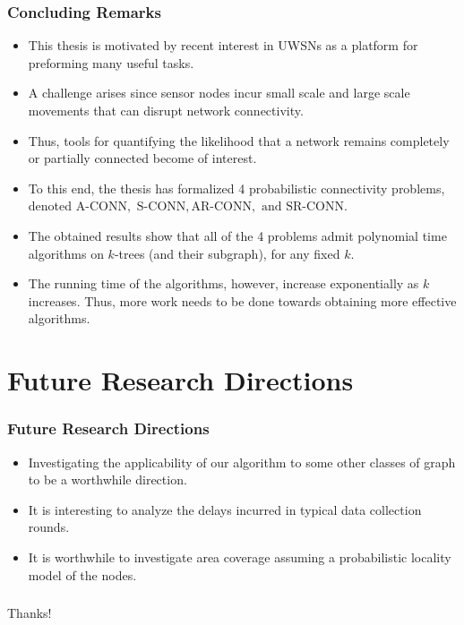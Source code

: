 \documentclass{beamer}
\newcommand{\ACONN}   { {\mathrm {A\mbox{-}CONN}} }
\newcommand{\SCONN}   { {\mathrm {S\mbox{-}CONN}} }
\newcommand{\ARCONN}   { {\mathrm {AR\mbox{-}CONN}} }
\newcommand{\SRCONN}   { {\mathrm {SR\mbox{-}CONN}} }
\begin{document}
\begin{frame}
\frametitle{Concluding Remarks}
\begin{itemize}
\item This thesis is motivated by recent interest in UWSNs as a platform for preforming many useful tasks. 
\item A challenge arises since sensor nodes incur small scale and large scale movements that can disrupt network connectivity.
\item  Thus, tools for quantifying the likelihood that a network remains completely or partially connected become of interest.

\item To this end, the thesis has formalized 4 probabilistic connectivity problems, denoted $\ACONN,$ $ \SCONN, \ARCONN, \mbox{ and } \SRCONN$. 
\item The obtained results show that all of the 4 problems admit polynomial time algorithms on $k$-trees (and their subgraph), for any fixed $k$.
\item  The running time of the algorithms, however, increase exponentially as $k$ increases. Thus, more work needs to be done towards obtaining more effective algorithms.
\end{itemize}
\end{frame}
\section{Future Research Directions}
\begin{frame}
\frametitle{Future Research Directions}
\begin{itemize}
\item Investigating the applicability of our algorithm to some other classes of graph to be a worthwhile direction.

\item It is interesting to analyze the delays incurred in typical data collection rounds.
\item It is worthwhile to investigate area coverage assuming a probabilistic locality model of the nodes.
\end{itemize}

\end{frame}


\begin{frame}
\frametitle{}
\begin{center}
\Huge Thanks!
\end{center}

\end{frame}
\end{document}

